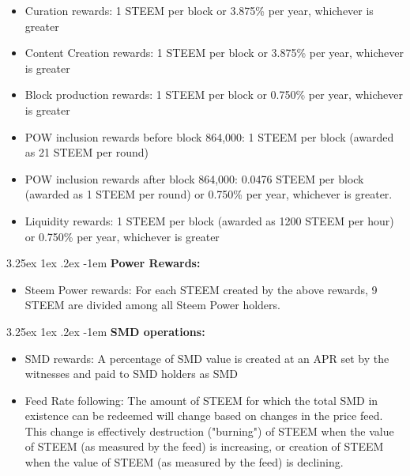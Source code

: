 \documentclass{article}
\makeatletter
\renewcommand\paragraph{\@startsection{paragraph}{5}{\z@}%
  {3.25ex \@plus1ex \@minus.2ex}%
  {-1em}%
  {\normalfont\normalsize\bfseries}}
\makeatother
\begin{document}
        \begin{itemize}
            \item Curation rewards: 1 STEEM per block or 3.875\% per year,
whichever is greater
            \item Content Creation rewards: 1 STEEM per block or 3.875\%
per year, whichever is greater
            \item Block production rewards: 1 STEEM per block or 0.750\%
per year, whichever is greater
            \item POW inclusion rewards before block 864,000: 1 STEEM per
block (awarded as 21 STEEM per round)
            \item POW inclusion rewards after block 864,000: 0.0476 STEEM
per block (awarded as 1 STEEM per round) or 0.750\% per year, whichever is
greater.
            \item Liquidity rewards: 1 STEEM per block (awarded as 1200
STEEM per hour) or 0.750\% per year, whichever is greater
        \end{itemize}

        \paragraph{}
            \textbf{Power Rewards:}

        \begin{itemize}
            \item Steem Power rewards: For each STEEM created by the above
rewards, 9 STEEM are divided among all Steem Power holders.
        \end{itemize}

        \paragraph{}
            \textbf{SMD operations:}

        \begin{itemize}
            \item SMD rewards: A percentage of SMD value is created at an
APR set by the witnesses and paid to SMD holders as SMD
            \item Feed Rate following: The amount of STEEM for which the
total SMD in existence can be redeemed will change based on changes in the
price feed. This change is effectively destruction ("burning") of STEEM
when the value of STEEM (as measured by the feed) is increasing, or
creation of STEEM when the value of STEEM (as measured by the feed) is
declining.
        \end{itemize}
\end{document}
